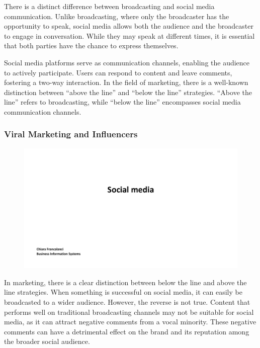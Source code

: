 There is a distinct difference between
broadcasting and social media communication. Unlike broadcasting, where
only the broadcaster has the opportunity to speak, social media allows
both the audience and the broadcaster to engage in conversation. While
they may speak at different times, it is essential that both parties
have the chance to express themselves.

Social media platforms serve as communication channels, enabling the
audience to actively participate. Users can respond to content and leave
comments, fostering a two-way interaction. In the field of marketing,
there is a well-known distinction between ``above the line'' and ``below
the line'' strategies. ``Above the line'' refers to broadcasting, while
``below the line'' encompasses social media communication channels.

\subsubsection{Viral Marketing and
  Influencers}\label{viral-marketing-and-influencers}

\begin{figure}[!h]
  \centering
  \includegraphics[page=19, trim = 2cm 7cm 3cm 4cm, clip, width=\imagewidth]{images/04 - Social_Media.pdf}
\end{figure}

In marketing, there is a clear distinction between below
the line and above the line strategies. When something is successful on
social media, it can easily be broadcasted to a wider audience. However,
the reverse is not true. Content that performs well on traditional
broadcasting channels may not be suitable for social media, as it can
attract negative comments from a vocal minority. These negative comments
can have a detrimental effect on the brand and its reputation among the
broader social audience.

